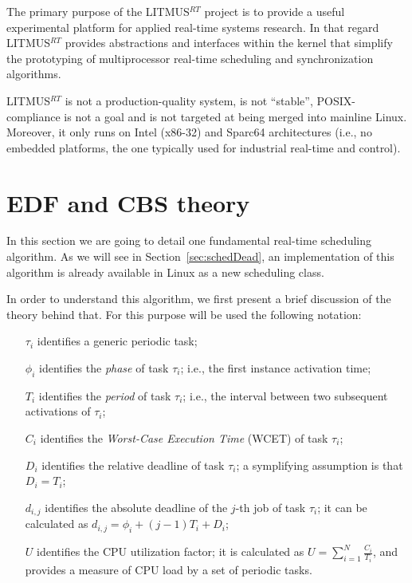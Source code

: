 The primary purpose of the LITMUS$^{RT}$ project is to provide a
useful experimental platform for applied real-time systems
research. In that regard LITMUS$^{RT}$ provides abstractions and
interfaces within the kernel that simplify the prototyping of
multiprocessor real-time scheduling and
synchronization algorithms.

LITMUS$^{RT}$ is not a production-quality system, is not ``stable'',
POSIX-compliance is not a goal and is not targeted at being merged
into mainline Linux. Moreover, it only runs on Intel (x86-32) and
Sparc64 architectures (i.e., no embedded platforms, the one typically
used for industrial real-time and control).

\section{EDF and CBS theory\label{sec:EDFCBS}}

In this section we are going to detail one fundamental real-time
scheduling algorithm. As we will see in Section~\ref{sec:schedDead},
an implementation of this algorithm is already available in Linux as a
new scheduling class.

In order to understand this algorithm, we first present a brief
discussion of the theory behind that. For this purpose will be used
the following notation:
\begin{itemize}
\item[$\tau_{i}$] identifies a generic periodic task;
\item[$\phi_{i}$] identifies the \emph{phase} of task $\tau_{i}$; i.e., the
first instance activation time;
\item [$T_{i}$] identifies the \emph{period} of task $\tau_{i}$; i.e., the
interval between two subsequent activations of $\tau_{i}$;
\item [$C_{i}$] identifies the \emph{Worst-Case Execution Time} (WCET) of task
$\tau_{i}$;
\item[$D_{i}$] identifies the relative deadline of task $\tau_{i}$; a
symplifying assumption is that $D_{i} = T_{i}$;
\item[$d_{i,j}$] identifies the absolute deadline of the $j$-th job of
task $\tau_{i}$; it can be calculated as
$d_{i,j} = \phi_{i} + (j -1)T_{i} + D_{i}$;
\item[$U$] identifies the CPU utilization factor; it is calculated as
$U = \displaystyle\sum_{i=1}^N \frac{C_{i}}{T_{i}}$, and provides a measure of
CPU load by a set of periodic tasks.
\end{itemize}

